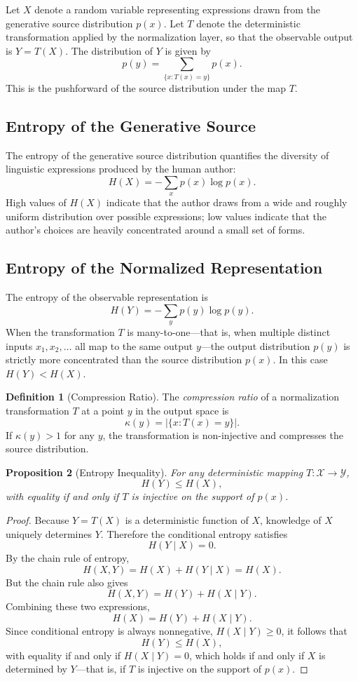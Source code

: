 \documentclass[12pt,a4paper]{article}
\theoremstyle{definition}
\newtheorem{definition}{Definition}[section]
\theoremstyle{plain}
\newtheorem{proposition}[definition]{Proposition}
\theoremstyle{remark}
\begin{document}
Let $X$ denote a random variable representing expressions drawn from the generative source
distribution $p(x)$. Let $T$ denote the deterministic transformation applied by the
normalization layer, so that the observable output is $Y = T(X)$. The distribution of $Y$ is
given by
\[
p(y) = \sum_{\{x : T(x) = y\}} p(x).
\]
This is the pushforward of the source distribution under the map $T$.

\subsection{Entropy of the Generative Source}

The entropy of the generative source distribution quantifies the diversity of linguistic
expressions produced by the human author:
\[
H(X) = -\sum_x p(x)\log p(x).
\]
High values of $H(X)$ indicate that the author draws from a wide and roughly uniform
distribution over possible expressions; low values indicate that the author's choices are
heavily concentrated around a small set of forms.

\subsection{Entropy of the Normalized Representation}

The entropy of the observable representation is
\[
H(Y) = -\sum_y p(y)\log p(y).
\]
When the transformation $T$ is many-to-one---that is, when multiple distinct inputs $x_1, x_2,
\ldots$ all map to the same output $y$---the output distribution $p(y)$ is strictly more
concentrated than the source distribution $p(x)$. In this case $H(Y) < H(X)$.

\begin{definition}[Compression Ratio]
The \emph{compression ratio} of a normalization transformation $T$ at a point $y$ in the
output space is
\[
\kappa(y) = |\{x : T(x) = y\}|.
\]
If $\kappa(y) > 1$ for any $y$, the transformation is non-injective and compresses the
source distribution.
\end{definition}

\begin{proposition}[Entropy Inequality]
\label{prop:entropy}
For any deterministic mapping $T : \mathcal{X} \to \mathcal{Y}$,
\[
H(Y) \leq H(X),
\]
with equality if and only if $T$ is injective on the support of $p(x)$.
\end{proposition}

\begin{proof}
Because $Y = T(X)$ is a deterministic function of $X$, knowledge of $X$ uniquely determines
$Y$. Therefore the conditional entropy satisfies
\[
H(Y \mid X) = 0.
\]
By the chain rule of entropy,
\[
H(X, Y) = H(X) + H(Y \mid X) = H(X).
\]
But the chain rule also gives
\[
H(X, Y) = H(Y) + H(X \mid Y).
\]
Combining these two expressions,
\[
H(X) = H(Y) + H(X \mid Y).
\]
Since conditional entropy is always nonnegative, $H(X \mid Y) \geq 0$, it follows that
\[
H(Y) \leq H(X),
\]
with equality if and only if $H(X \mid Y) = 0$, which holds if and only if $X$ is determined
by $Y$---that is, if $T$ is injective on the support of $p(x)$.
\end{proof}
\end{document}
